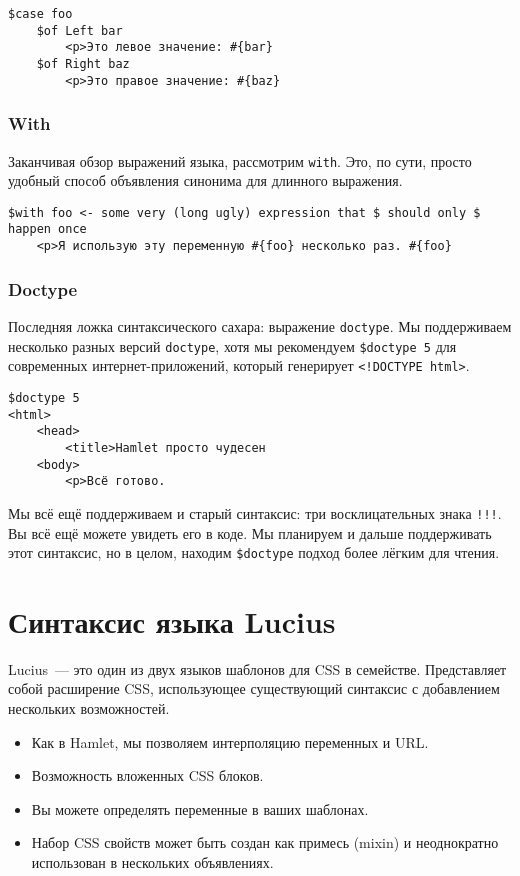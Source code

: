 \begin{lstlisting}
$case foo
    $of Left bar
        <p>Это левое значение: #{bar}
    $of Right baz
        <p>Это правое значение: #{baz}
\end{lstlisting}

\subsubsection{With}

Заканчивая обзор выражений языка, рассмотрим \lstinline'with'. Это, по сути,
просто удобный способ объявления синонима для длинного выражения.

\begin{lstlisting}
$with foo <- some very (long ugly) expression that $ should only $ happen once
    <p>Я использую эту переменную #{foo} несколько раз. #{foo}
\end{lstlisting}

\subsubsection{Doctype}
Последняя ложка синтаксического сахара: выражение \lstinline'doctype'. Мы
поддерживаем несколько разных версий \lstinline'doctype', хотя мы рекомендуем
\lstinline'$doctype 5' для современных интернет-приложений, который генерирует
\lstinline'<!DOCTYPE html>'.

\begin{lstlisting}
$doctype 5
<html>
    <head>
        <title>Hamlet просто чудесен
    <body>
        <p>Всё готово.
\end{lstlisting}

\begin{remark}
    Мы всё ещё поддерживаем и старый синтаксис: три восклицательных знака
    \lstinline'!!!'.  Вы всё ещё можете увидеть его в коде. Мы планируем и дальше
    поддерживать этот синтаксис, но в целом, находим \lstinline'$doctype'
    подход более лёгким для чтения.
\end{remark}

\section{Синтаксис языка Lucius}

Lucius~--- это один из двух языков шаблонов для CSS в семействе. Представляет
собой расширение CSS, использующее существующий синтаксис с добавлением
нескольких возможностей.

\begin{itemize}
    \item Как в Hamlet, мы позволяем интерполяцию переменных и URL.
    \item Возможность вложенных CSS блоков.
    \item Вы можете определять переменные в ваших шаблонах.
    \item Набор CSS свойств может быть создан как примесь (mixin) и
        неоднократно использован в нескольких объявлениях.
\end{itemize}

